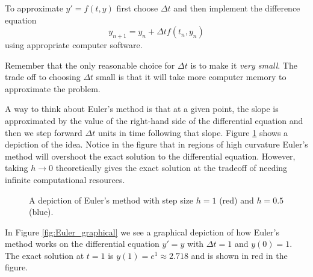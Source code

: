 \begin{technique}
    To approximate $y' = f(t,y)$ first choose $\Delta t$ and then implement the difference
    equation
    \[ y_{n+1} = y_n + \Delta t f(t_n,y_n) \]
    using appropriate computer software. 
\end{technique}
Remember that the only reasonable choice for
$\Delta t$ is to make it {\it very small}.  The trade off to choosing $\Delta t$ small
is that it will take more computer memory to approximate the problem.

A way to think about Euler's method is that at a given point, the slope is approximated by
the value of the right-hand side of the differential equation and then we step forward
$\Delta t$
units in time following that slope.  Figure \ref{fig:Euler} shows a depiction of the idea.
Notice in the figure that in regions of high curvature Euler's method will overshoot the
exact solution to the differential equation.  However, taking $h \to 0$ theoretically
gives the exact solution at the tradeoff of needing infinite computational resources.

\begin{figure}[ht!]
    \begin{center}
    \end{center}
    \caption{A depiction of Euler's method with step size $h=1$ (red) and $h=0.5$ (blue).}
    \label{fig:Euler}
\end{figure}


In Figure
\ref{fig:Euler_graphical} we see a graphical depiction of how Euler's method works on the
differential equation $y' = y$ with $\Delta t = 1$ and $y(0) = 1$.  The exact solution
at $t=1$ is $y(1) = e^1 \approx 2.718$ and is shown in red in the figure. 

